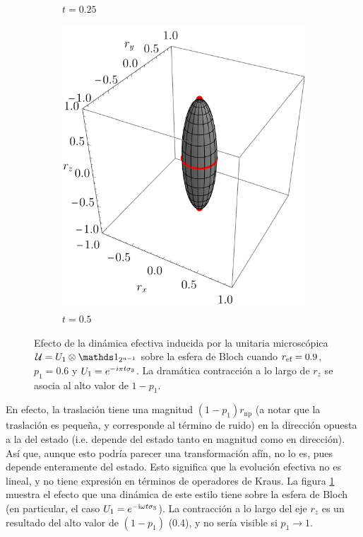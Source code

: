 \begin{figure}[ht!]
\begin{subfigure}{0.32\textwidth}
      \caption{$t=0.25$}
    \end{subfigure}
    \begin{subfigure}{0.32\textwidth}
      \centering
      \includegraphics[width=0.9\linewidth]{chapter4/figures_separable/szxId_t=0.5_p=0.6_r=0.9.pdf}
      \caption{$t=0.5$}
    \end{subfigure}
    \caption{Efecto de la dinámica efectiva inducida por la unitaria microscópica $\mcU=U_{1}\otimes\Id_{2^{n-1}}$ sobre la esfera de Bloch cuando $r_{\text{ef}}=0.9$, $p_{1}=0.6$ y $U_{1}=e^{-i\pi t \sigma_{3}}$. La dramática contracción a lo largo de $r_{z}$ se asocia al alto valor de $1-p_{1}$. \label{fig:FaseChangeSequence}}
\end{figure}

En efecto, la traslación tiene una magnitud $(1-p_{1})r_{\text{np}}$ (a notar que la traslación es pequeña, y corresponde al término de ruido) en la dirección opuesta a la del estado (i.e. depende del estado tanto en magnitud como en dirección). Así que, aunque esto podría parecer una transformación afín, no lo es, pues depende enteramente del estado. Esto significa que la evolución efectiva no es lineal, y no tiene expresión en términos de operadores de Kraus. La figura \ref{fig:FaseChangeSequence} muestra el efecto que una dinámica de este estilo tiene sobre la esfera de Bloch (en particular, el caso $U_{1}=e^{-\text{i}\omega t \sigma_{3}}$). La contracción a lo largo del eje $r_{z}$ es un resultado del alto valor de $(1-p_{1})$ (0.4), y no sería visible si $p_{1}\rightarrow 1$.



